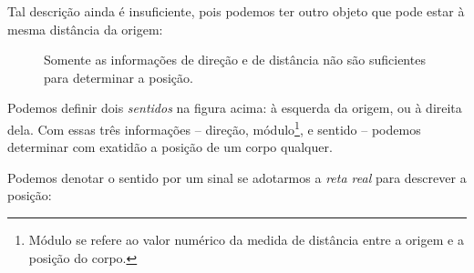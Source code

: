 Tal descrição ainda é insuficiente, pois podemos ter outro objeto que pode estar à mesma distância da origem:

\begin{figure}
\centering
{}
\caption{Somente as informações de direção e de distância não são suficientes para determinar a posição.}
\end{figure}

\noindent{}Podemos definir dois \emph{sentidos} na figura acima: à esquerda da origem, ou à direita dela. Com essas três informações -- direção, módulo\footnote{Módulo se refere ao valor numérico da medida de distância entre a origem e a posição do corpo.}, e sentido -- podemos determinar com exatidão a posição de um corpo qualquer.

\pagebreak
Podemos denotar o sentido por um sinal se adotarmos a \emph{reta real} para descrever a posição:

